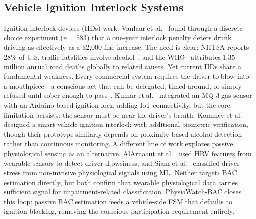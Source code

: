 \documentclass[HARVARD,Times2COL]{WileyNJDv5} %
\begin{document}
\subsection{Vehicle Ignition Interlock Systems}
Ignition interlock devices (IIDs) work. Vanlaar et al.~\citep{interlock2024} found through a discrete choice experiment ($n=583$) that a one-year interlock penalty deters drunk driving as effectively as a \$2,000 fine increase. The need is clear: NHTSA reports 28\% of U.S. traffic fatalities involve alcohol~\citep{nhtsa2022}, and the WHO~\citep{who2018} attributes 1.35 million annual road deaths globally to related causes.
Yet current IIDs share a fundamental weakness. Every commercial system requires the driver to blow into a mouthpiece---a conscious act that can be delegated, timed around, or simply refused until sober enough to pass~\citep{das2023, vedanarayanan2024}. Kumar et al.~\citep{kumar2023} integrated an MQ-3 gas sensor with an Arduino-based ignition lock, adding IoT connectivity, but the core limitation persists: the sensor must be near the driver's breath. Kommey et al.~\citep{kommey2022} designed a smart vehicle ignition interlock with additional biometric verification, though their prototype similarly depends on proximity-based alcohol detection rather than continuous monitoring.
A different line of work explores passive physiological sensing as an alternative. AlArnaout et al.~\citep{alarnaout2025} used HRV features from wearable sensors to detect driver drowsiness, and Siam et al.~\citep{siam2023} classified driver stress from non-invasive physiological signals using ML. Neither targets BAC estimation directly, but both confirm that wearable physiological data carries sufficient signal for impairment-related classification. PhysioWatch-BAC closes this loop: passive BAC estimation feeds a vehicle-side FSM that defaults to ignition blocking, removing the conscious participation requirement entirely.
\end{document}
